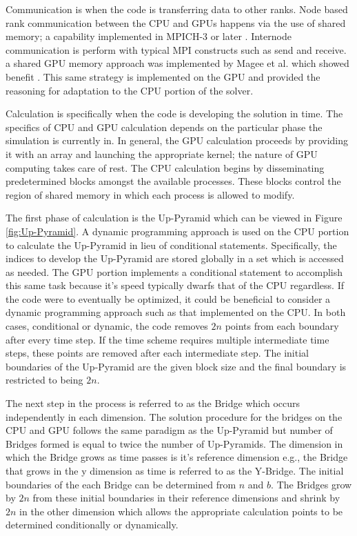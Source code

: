 \documentclass[review]{elsarticle}
\begin{document}
\par
 Communication is when the code is transferring data to other ranks. Node based rank communication between the CPU and GPUs happens via the use of shared memory; a capability implemented in MPICH-3 or later \cite{Hoefler2013MPIMemory}. Internode communication is perform with typical MPI constructs such as send and receive. a shared GPU memory approach was implemented by Magee et al. which showed benefit \cite{Magee2018AcceleratingDecomposition}. This same strategy is implemented on the GPU and provided the reasoning for adaptation to the CPU portion of the solver. 
 
 \par
 Calculation is specifically when the code is developing the solution in time. The specifics of CPU and GPU calculation depends on the particular phase the simulation is currently in. In general, the GPU calculation proceeds by providing it with an array and launching the appropriate kernel; the nature of GPU computing takes care of rest. The CPU calculation begins by disseminating predetermined blocks amongst the available processes. These blocks control the region of shared memory in which each process is allowed to modify.
 
\par
The first phase of calculation is the Up-Pyramid which can be viewed in Figure \ref{fig:Up-Pyramid}. A dynamic programming approach is used on the CPU portion to calculate the Up-Pyramid in lieu of conditional statements. Specifically, the indices to develop the Up-Pyramid are stored globally in a set which is accessed as needed. The GPU portion implements a conditional statement to accomplish this same task because it's speed typically dwarfs that of the CPU regardless. If the code were to eventually be optimized, it could be beneficial to consider a dynamic programming approach such as that implemented on the CPU. In both cases, conditional or dynamic, the code removes $2n$ points from each boundary after every time step. If the time scheme requires multiple intermediate time steps, these points are removed after each intermediate step. The initial boundaries of the Up-Pyramid are the given block size and the final boundary is restricted to being $2n$.

\par The next step in the process is referred to as the Bridge which occurs independently in each dimension. The solution procedure for the bridges on the CPU and GPU follows the same paradigm as the Up-Pyramid but number of Bridges formed is equal to twice the number of Up-Pyramids. The dimension in which the Bridge grows as time passes is it's reference dimension e.g., the Bridge that grows in the y dimension as time is referred to as the Y-Bridge. The initial boundaries of the each Bridge can be determined from $n$ and $b$. The Bridges grow by $2n$ from these initial boundaries in their reference dimensions and shrink by $2n$ in the other dimension which allows the appropriate calculation points to be determined conditionally or dynamically.
\end{document}
